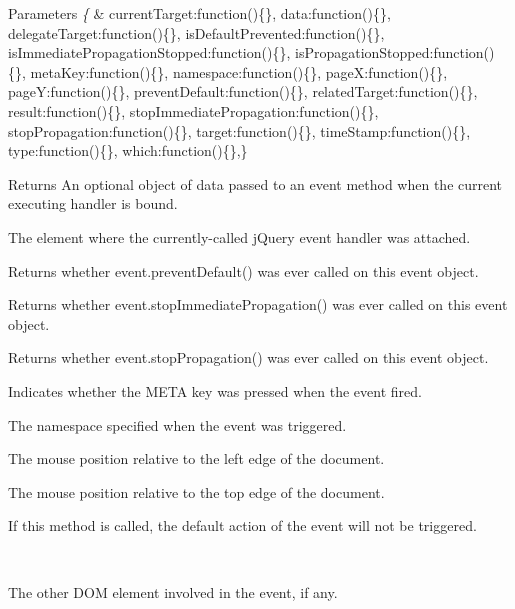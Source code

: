 \begin{DoxyParams}{Parameters}
{\em \{} & \textquotesingle{}current\+Target\textquotesingle{}\+:function()\{\}, \textquotesingle{}data\textquotesingle{}\+:function()\{\}, \textquotesingle{}delegate\+Target\textquotesingle{}\+:function()\{\}, \textquotesingle{}is\+Default\+Prevented\textquotesingle{}\+:function()\{\}, \textquotesingle{}is\+Immediate\+Propagation\+Stopped\textquotesingle{}\+:function()\{\}, \textquotesingle{}is\+Propagation\+Stopped\textquotesingle{}\+:function()\{\}, \textquotesingle{}meta\+Key\textquotesingle{}\+:function()\{\}, \textquotesingle{}namespace\textquotesingle{}\+:function()\{\}, \textquotesingle{}page\+X\textquotesingle{}\+:function()\{\}, \textquotesingle{}page\+Y\textquotesingle{}\+:function()\{\}, \textquotesingle{}prevent\+Default\textquotesingle{}\+:function()\{\}, \textquotesingle{}related\+Target\textquotesingle{}\+:function()\{\}, \textquotesingle{}result\textquotesingle{}\+:function()\{\}, \textquotesingle{}stop\+Immediate\+Propagation\textquotesingle{}\+:function()\{\}, \textquotesingle{}stop\+Propagation\textquotesingle{}\+:function()\{\}, \textquotesingle{}target\textquotesingle{}\+:function()\{\}, \textquotesingle{}time\+Stamp\textquotesingle{}\+:function()\{\}, \textquotesingle{}type\textquotesingle{}\+:function()\{\}, \textquotesingle{}which\textquotesingle{}\+:function()\{\},\} \begin{DoxyReturn}{Returns}
An optional object of data passed to an event method when the current executing handler is bound.

The element where the currently-\/called j\+Query event handler was attached.

Returns whether event.\+prevent\+Default() was ever called on this event object.

Returns whether event.\+stop\+Immediate\+Propagation() was ever called on this event object.

Returns whether event.\+stop\+Propagation() was ever called on this event object.

Indicates whether the M\+E\+T\+A key was pressed when the event fired.

The namespace specified when the event was triggered.

The mouse position relative to the left edge of the document.

The mouse position relative to the top edge of the document.

If this method is called, the default action of the event will not be triggered.
\end{DoxyReturn}
\\
\hline
\end{DoxyParams}
The other D\+O\+M element involved in the event, if any.

